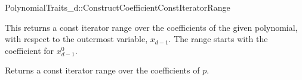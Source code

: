 \begin{ccRefConcept}{PolynomialTraits_d::ConstructCoefficientConstIteratorRange}

\ccDefinition

This  returns a const iterator range over the 
coefficients of the given polynomial, with respect to the outermost variable, $x_{d-1}$.
The range starts with the coefficient for $x_{d-1}^0$. \\

\ccRefines 
{}

\ccTypes


\ccGlue
{}

\ccOperations
{}
         {Returns a const iterator range over the coefficients of $p$.}


\ccSeeAlso

\\
\\

\end{ccRefConcept}
